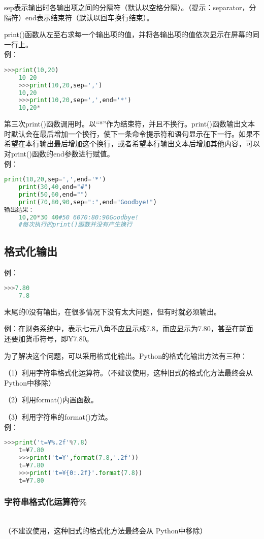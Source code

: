\documentclass[11pt,a4paper]{article}
\begin{document}
sep表示输出时各输出项之间的分隔符（默认以空格分隔）。（提示：separator，分隔符）end表示结束符（默认以回车换行结束）。

print()函数从左至右求每一个输出项的值，并将各输出项的值依次显示在屏幕的同一行上。\\
例：
\begin{lstlisting}[language={Python}]
    >>>print(10,20)
    10 20
    >>>print(10,20,sep=',')
    10,20
    >>>print(10,20,sep=',',end='*')
    10,20*
\end{lstlisting}

第三次print()函数调用时。以“*”作为结束符，并且不换行。print()函数输出文本时默认会在最后增加一个换行，使下一条命令提示符和语句显示在下一行。如果不希望在本行输出最后增加这个换行，或者希望本行输出文本后增加其他内容，可以对print()函数的end参数进行赋值。\\
例：
\begin{lstlisting}[language={Python}]
    print(10,20,sep=',',end='*')
    print(30,40,end="#")
    print(50,60,end="")
    print(70,80,90,sep=":",end="Goodbye!")
输出结果：
    10,20*30 40#50 6070:80:90Goodbye!
    #每次执行的print()函数并没有产生换行
\end{lstlisting}

\subsection{格式化输出}

例：
\begin{lstlisting}[language={Python}]
    >>>7.80
    7.8
\end{lstlisting}
末尾的0没有输出，在很多情况下没有太大问题，但有时就必须输出。

例：在财务系统中，表示七元八角不应显示成7.8，而应显示为7.80，甚至在前面还要加货币符号，即¥7.80。

为了解决这个问题，可以采用格式化输出。Python的格式化输出方法有三种：

（1）利用字符串格式化运算符。（不建议使用，这种旧式的格式化方法最终会从Python中移除）

（2）利用format()内置函数。

（3）利用字符串的format()方法。\\
例：
\begin{lstlisting}[language={Python}]
    >>>print('t=¥%.2f'%7.8)
    t=¥7.80
    >>>print('t=¥',format(7.8,'.2f'))
    t=¥7.80
    >>>print('t=¥{0:.2f}'.format(7.8))
    t=¥7.80
\end{lstlisting}

\subsubsection{字符串格式化运算符\%}~{}\\
（不建议使用，这种旧式的格式化方法最终会从
Python中移除）
\end{document}
